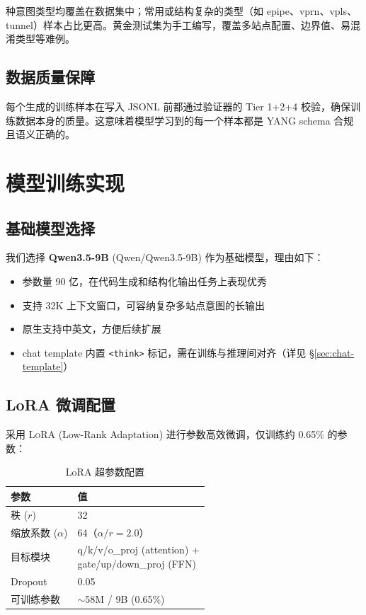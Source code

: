 \documentclass[12pt, a4paper]{article}
\newcommand{\yang}{\textsc{YANG}}
\newcommand{\lora}{\textsc{LoRA}}
\begin{document}
 种意图类型均覆盖在数据集中；常用或结构复杂的类型（如 epipe、vprn、vpls、tunnel）样本占比更高。黄金测试集为手工编写，覆盖多站点配置、边界值、易混淆类型等难例。

\subsection{数据质量保障}

每个生成的训练样本在写入 JSONL 前都通过验证器的 Tier 1+2+4 校验，确保训练数据本身的质量。这意味着模型学习到的每一个样本都是 \yang{} schema 合规且语义正确的。

\section{模型训练实现}
\label{sec:training}

\subsection{基础模型选择}

我们选择 \textbf{Qwen3.5-9B} (Qwen/Qwen3.5-9B) 作为基础模型，理由如下：

\begin{itemize}
  \item 参数量 90 亿，在代码生成和结构化输出任务上表现优秀
  \item 支持 32K 上下文窗口，可容纳复杂多站点意图的长输出
  \item 原生支持中英文，方便后续扩展
  \item chat template 内置 \texttt{<think>} 标记，需在训练与推理间对齐（详见 \S\ref{sec:chat-template}）
\end{itemize}

\subsection{LoRA 微调配置}

采用 \lora{} (Low-Rank Adaptation) 进行参数高效微调，仅训练约 0.65\% 的参数：

\begin{table}[H]
\centering
\caption{LoRA 超参数配置}
\label{tab:lora-config}
\small
\begin{tabular}{ll}
\toprule
\textbf{参数} & \textbf{值} \\
\midrule
秩 ($r$)                & 32 \\
缩放系数 ($\alpha$)     & 64（$\alpha/r = 2.0$）\\
目标模块               & \makecell[l]{q/k/v/o\_proj (attention) +\\gate/up/down\_proj (FFN)} \\
Dropout                & 0.05 \\
可训练参数             & $\sim$58M / 9B (0.65\%) \\
\bottomrule
\end{tabular}
\end{table}
\end{document}
